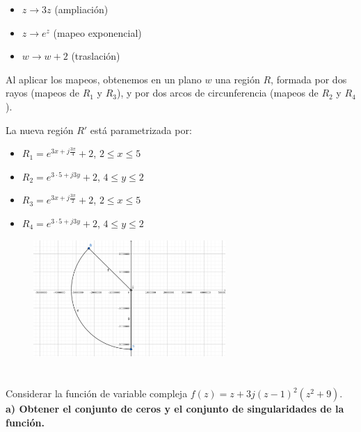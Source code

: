 \documentclass[12pt]{report}
\begin{document}
\begin{itemize}
    \item $z \rightarrow 3z$ (ampliación)
    \item $z \rightarrow e^z$ (mapeo exponencial)
    \item $w \rightarrow w + 2$ (traslación)
\end{itemize}

Al aplicar los mapeos, obtenemos en un plano $w$ una región $R$, formada por dos rayos (mapeos de $R_1$ y $R_3$), y por dos arcos de circunferencia (mapeos de $R_2$ y $R_4$).

La nueva región $R'$ está parametrizada por:
\begin{itemize}
    \item $R_1 = e^{3x+j\frac{3\pi}{4}} + 2$, $2 \leq x \leq 5$
    \item $R_2 = e^{3 \cdot 5+j3y} + 2$, $4 \leq y \leq 2$
    \item $R_3 = e^{3x+j\frac{3\pi}{2}} + 2$, $2 \leq x \leq 5$
    \item $R_4 = e^{3 \cdot 5+j3y} + 2$, $4 \leq y \leq 2$
\end{itemize}


\begin{figure}[h] %
    \centering %
    \includegraphics[width=0.65\textwidth]{./Imagenes/foto2Ej4.png} %
\end{figure}

\chapter{}

Considerar la función de variable compleja $f(z) = z + 3j(z - 1)^2(z^2 + 9)$.\\[6pt]

\textbf{a) Obtener el conjunto de ceros y el conjunto de singularidades de la función.}\\[6pt]
\end{document}
